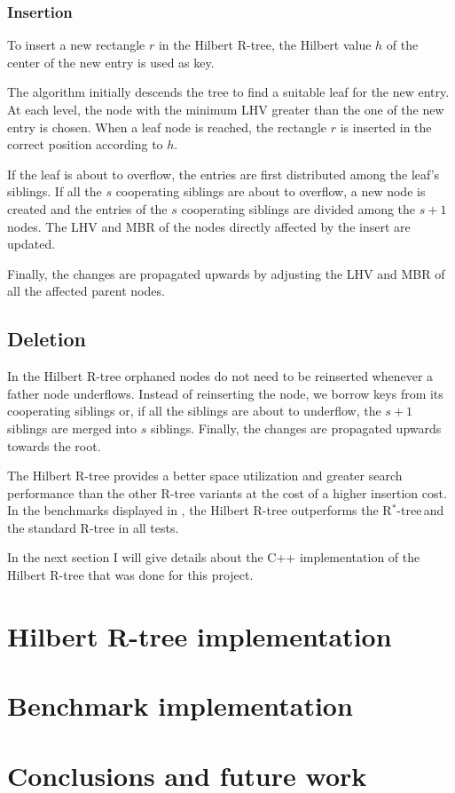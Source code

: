 \documentclass[11pt, a4paper, oneside]{article}
\newcommand{\rstar}{R$^*$-tree$\,$}
\begin{document}
\subsubsection*{Insertion}
To insert a new rectangle $r$ in the Hilbert R-tree, the Hilbert value $h$ of the center of the new entry is used as key. 

The algorithm initially descends the tree to find a suitable leaf for the new entry. At each level, the node with the minimum LHV greater than the one of the new entry is chosen. When a leaf node is reached, the rectangle $r$ is inserted in the correct position according to $h$.

If the leaf is about to overflow, the entries are first distributed among the leaf's siblings. If all the $s$ cooperating siblings are about to overflow, a new node is created and the entries of the $s$ cooperating siblings are divided among the $s+1$ nodes. The LHV and MBR of the nodes directly affected by the insert are updated.

Finally, the changes are propagated upwards by adjusting the LHV and MBR of all the affected parent nodes.

\subsection*{Deletion}
In the Hilbert R-tree orphaned nodes do not need to be reinserted whenever a father node underflows. Instead of reinserting the node, we borrow keys from its cooperating siblings or, if all the siblings are about to underflow, the $s+1$ siblings are merged into $s$ siblings. Finally, the changes are propagated upwards towards the root.

The Hilbert R-tree provides a better space utilization and greater search performance than the other R-tree variants at the cost of a higher insertion cost. In the benchmarks displayed in \cite{Kamel:1994:HRI:645920.673001}, the Hilbert R-tree outperforms the \rstar and the standard R-tree in all tests.

In the next section I will give details about the C++ implementation of the Hilbert R-tree that was done for this project.
\section{Hilbert R-tree implementation}
\label{sec:hrtree}

\section{Benchmark implementation}
\label{sec:benchmark}

\section{Conclusions and future work}
\label{sec:conclusions}

\newpage


\newpage
\end{document}
